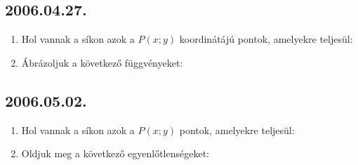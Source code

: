 \subsection*{2006.04.27.}
\begin{enumerate}
\item Hol vannak a síkon azok a $P(x;y)$ koordinátájú pontok, amelyekre teljesül:
\item Ábrázoljuk a következő függvényeket:
\end{enumerate}

\subsection*{2006.05.02.}
\begin{enumerate}
\item Hol vannak a síkon azok a $P(x;y)$ pontok, amelyekre teljesül:
\item Oldjuk meg a következő egyenlőtlenségeket:
\end{enumerate}

